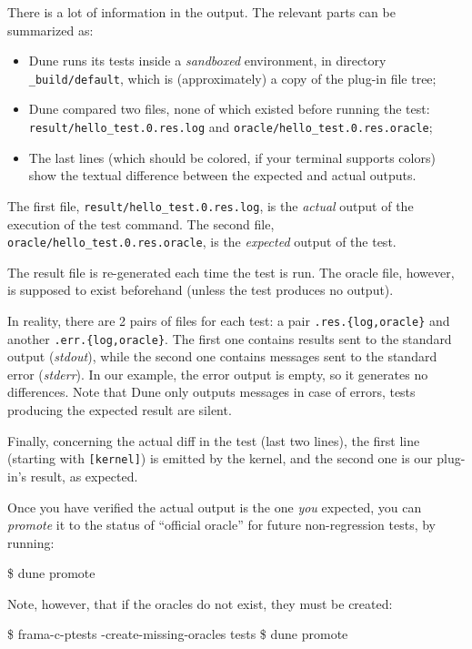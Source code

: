 There is a lot of information in the output. The relevant parts
can be summarized as:

\begin{itemize}
\item Dune runs its tests inside a {\em sandboxed} environment, in directory
  \verb|_build/default|, which is (approximately) a copy of the plug-in
  file tree;
\item Dune compared two files, none of which existed before running the test:
  \verb|result/hello_test.0.res.log| and \verb|oracle/hello_test.0.res.oracle|;
\item The last lines (which should be colored, if your terminal supports colors)
  show the textual difference between the expected and actual outputs.
\end{itemize}

The first file, \verb|result/hello_test.0.res.log|, is the {\em actual} output of
the execution of the test command.
The second file, \verb|oracle/hello_test.0.res.oracle|, is the {\em expected}
output of the test.

The result file is re-generated each time the test is run.
The oracle file, however, is supposed to exist beforehand
(unless the test produces no output).

In reality, there are 2 pairs of files for each test: a pair
\texttt{.res.\{log,oracle\}} and another \texttt{.err.\{log,oracle\}}.
The first one contains results sent to the standard output ({\em stdout}),
while the second one contains messages sent to the standard error
({\em stderr}). In our example, the error output is empty, so it generates no
differences. Note that Dune only outputs messages in case of errors,
\ie tests producing the expected result are silent.

Finally, concerning the actual diff in the test (last two lines), the first
line (starting with \texttt{[kernel]}) is emitted by the \framac kernel,
and the second one is our plug-in's result, as expected.

Once you have verified the actual output is the one {\em you} expected,
you can {\em promote} it to the status of ``official oracle'' for future
non-regression tests, by running:
\begin{shell}
\$ dune promote
\end{shell}
Note, however, that if the oracles do not exist, they must be created:
\begin{shell}
\$ frama-c-ptests -create-missing-oracles tests
\$ dune promote
\end{shell}

